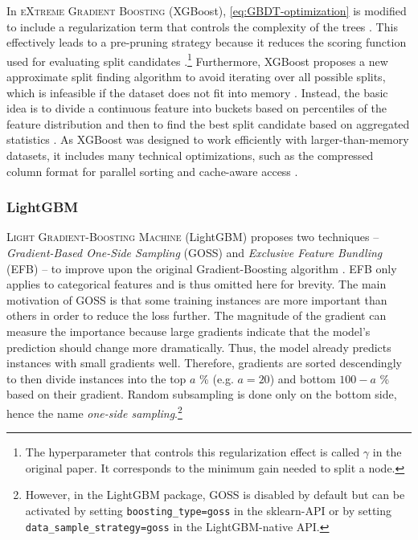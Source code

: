 In \textsc{eXtreme Gradient Boosting} (XGBoost), \cref{eq:GBDT-optimization} is modified to include a regularization term that controls the complexity of the trees \parencite[2]{chen_xgboost_2016}. This effectively leads to a pre-pruning strategy because it reduces the scoring function used for evaluating split candidates \parencites[1941--1942]{bentejac_comparative_2021}.\footnote{The hyperparameter that controls this regularization effect is called $\gamma$ in the original paper. It corresponds to the minimum gain needed to split a node.}
Furthermore, XGBoost proposes a new approximate split finding algorithm to avoid iterating over all possible splits, which is infeasible if the dataset does not fit into memory \parencite[Chapter~3]{chen_xgboost_2016}. Instead, the basic idea is to divide a continuous feature into buckets based on percentiles of the feature distribution and then to find the best split candidate based on aggregated statistics \parencite[Chapter~3.2]{chen_xgboost_2016}.
As XGBoost was designed to work efficiently with larger-than-memory datasets, it includes many technical optimizations, such as the compressed column format for parallel sorting and cache-aware access \parencite[Chapter~4]{chen_xgboost_2016}.

\subsubsection{LightGBM}

\textsc{Light Gradient-Boosting Machine} (LightGBM) proposes two techniques -- \textit{Gradient-Based One-Side Sampling} (GOSS) and \textit{Exclusive Feature Bundling} (EFB) -- to improve upon the original Gradient-Boosting algorithm \parencite[1]{ke_lightgbm_2017}. EFB only applies to categorical features and is thus omitted here for brevity. The main motivation of GOSS is that some training instances are more important than others in order to reduce the loss further. The magnitude of the gradient can measure the importance because large gradients indicate that the model's prediction should change more dramatically. Thus, the model already predicts instances with small gradients well. Therefore, gradients are sorted descendingly to then divide instances into the top $a$ \% (e.g. $a=20$) and bottom $100 - a$ \% based on their gradient. Random subsampling is done only on the bottom side, hence the name \textit{one-side sampling}.\footnote{However, in the LightGBM package, GOSS is disabled by default but can be activated by setting \texttt{boosting\_type=goss} in the sklearn-API or by setting \texttt{data\_sample\_strategy=goss} in the LightGBM-native API.}

